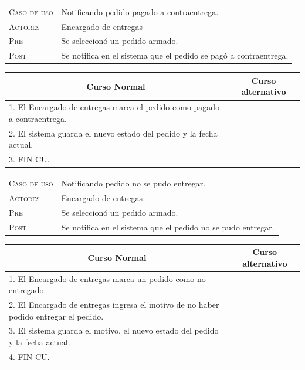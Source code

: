 \begin{tabular}{p{} p{}}
    \textsc{Caso de uso} & Notificando pedido pagado a contraentrega. \\
    \textsc{Actores} & Encargado de entregas \\
    \textsc{Pre} & Se seleccionó un pedido armado. \\
    \textsc{Post} & Se notifica en el sistema que el pedido se pagó a
    contraentrega. \\
\end{tabular}

\begin{center}
\begin{tabular}{|p{}|p{}|}
    \hline
    \multicolumn{1}{|c|}{Curso Normal} &
    \multicolumn{1}{|c|}{Curso alternativo} \\
    \hline
    1. El Encargado de entregas marca el pedido como pagado a contraentrega. & \\
    2. El sistema guarda el nuevo estado del pedido y la fecha actual. & \\
    3. FIN CU. & \\
    \hline
\end{tabular}
\end{center}

\newpage

\begin{tabular}{p{} p{}}
    \textsc{Caso de uso} & Notificando pedido no se pudo entregar. \\
    \textsc{Actores} & Encargado de entregas \\
    \textsc{Pre} & Se seleccionó un pedido armado. \\
    \textsc{Post} & Se notifica en el sistema que el pedido no se pudo
    entregar. \\
\end{tabular}

\begin{center}
\begin{tabular}{|p{}|p{}|}
    \hline
    \multicolumn{1}{|c|}{Curso Normal} &
    \multicolumn{1}{|c|}{Curso alternativo} \\
    \hline
    1. El Encargado de entregas marca un pedido como no entregado. & \\
    2. El Encargado de entregas ingresa el motivo de no haber podido entregar el pedido. & \\
    3. El sistema guarda el motivo, el nuevo estado del pedido y la fecha actual. & \\
    4. FIN CU. & \\
    \hline
\end{tabular}
\end{center}

